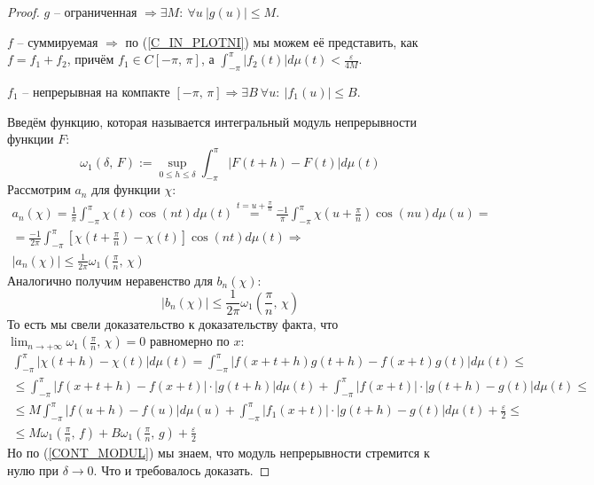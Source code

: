 \documentclass[a4paper,12pt]{article}
\renewcommand{\leq}{\ensuremath{\leqslant}}
\theoremstyle{plain}
\theoremstyle{definition}
\theoremstyle{remark}
\begin{document}
\begin{proof}
	$g$ -- ограниченная $\Rightarrow \exists M:\: \forall u \: |g(u)| \leq M$.

	$f$ -- суммируемая $\Rightarrow$ по (\ref{C_IN_PLOTNI}) мы можем её представить, как $f = f_1 + f_2$, причём $f_1 \in C[-\pi,\,\pi]$, а $\int_{-\pi}^{\pi} |f_2(t)|d\mu(t) < \frac{\varepsilon}{4M}$.

	$f_1$ -- непрерывная на компакте $[-\pi,\,\pi] \Rightarrow \exists B \: \forall u:\: |f_1(u)| \leq B$.

	Введём функцию, которая называется интегральный модуль непрерывности функции $F$:
	\[\omega_1(\delta,\,F) := \sup_{0 \leq h \leq \delta} \int_{-\pi}^\pi |F(t + h) - F(t)|d\mu(t)\]
	Рассмотрим $a_n$ для функции $\chi$:
	\begin{align*}
		a_n(\chi) = \frac{1}{\pi} \int_{-\pi}^\pi \chi(t)\cos(nt)d\mu(t) \stackrel{t = u + \frac{\pi}{n}}{=} \frac{-1}{\pi}\int_{-\pi}^\pi \chi\left(u + \frac{\pi}{n}\right)\cos(nu)d\mu(u) = \\
		= \frac{-1}{2\pi}\int_{-\pi}^\pi \left[\chi\left(t + \frac{\pi}{n}\right) - \chi(t)\right]\cos(nt)d\mu(t) \Rightarrow                                                                  \\
		|a_n(\chi)| \leq \frac{1}{2\pi}\omega_1\left(\frac{\pi}{n},\, \chi\right)
	\end{align*}
	Аналогично получим неравенство для $b_n(\chi)$:
	\[|b_n(\chi)| \leq \frac{1}{2\pi}\omega_1\left(\frac{\pi}{n},\,\chi\right)\]
	То есть мы свели доказательство к доказательству факта, что $\lim_{n \to +\infty}\omega_1(\frac{\pi}{n},\,\chi) = 0$ равномерно по $x$:
	\begin{align*}
		\int_{-\pi}^\pi |\chi(t + h) - \chi(t)|d\mu(t) = \int_{-\pi}^\pi |f(x + t + h)g(t + h) - f(x + t)g(t)|d\mu(t) \leq                        \\
		\leq \int_{-\pi}^\pi |f(x + t + h) - f(x + t)|\cdot |g (t + h)|d\mu(t) + \int_{-\pi}^\pi |f(x + t)|\cdot |g(t + h) - g(t)|d\mu(t) \leq    \\
		\leq M \int_{-\pi}^\pi |f(u + h) - f(u)|d\mu(u) +  \int_{-\pi}^\pi |f_1(x + t)|\cdot|g(t + h) - g(t)|d\mu(t) + \frac{\varepsilon}{2} \leq \\
		\leq M \omega_1(\frac{\pi}{n},\, f) + B\omega_1(\frac{\pi}{n},\,g) + \frac{\varepsilon}{2}
	\end{align*}
	Но по (\ref{CONT_MODUL}) мы знаем, что модуль непрерывности стремится к нулю при $\delta \to 0$. Что и требовалось доказать.
\end{proof}
\end{document}
